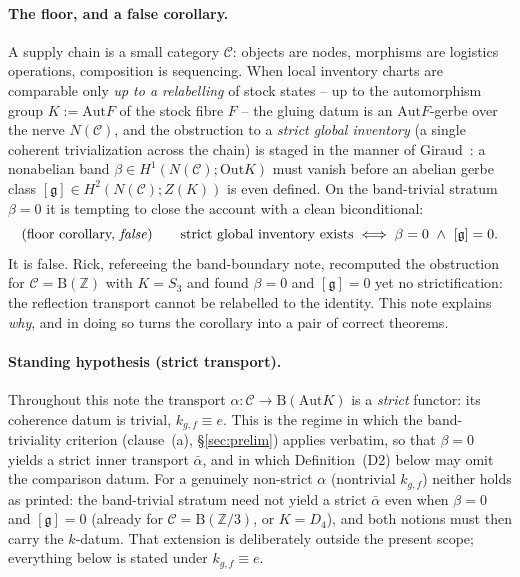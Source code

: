 \documentclass[11pt]{article}
\theoremstyle{definition}
\newcommand{\C}{\mathcal{C}}
\newcommand{\Z}{\mathbb{Z}}
\newcommand{\Aut}{\mathrm{Aut}}
\newcommand{\Out}{\mathrm{Out}}
\newcommand{\gerbe}{\mathfrak{g}}
\newcommand{\abar}{\bar{\alpha}}
\newcommand{\B}{\mathrm{B}}
\begin{document}
\paragraph{The floor, and a false corollary.} A supply chain is a small category $\C$:
objects are nodes, morphisms are logistics operations, composition is sequencing. When
local inventory charts are comparable only \emph{up to a relabelling} of stock states --
up to the automorphism group $K:=\Aut F$ of the stock fibre $F$ -- the gluing datum is an
$\Aut F$-gerbe over the nerve $N(\C)$, and the obstruction to a \emph{strict global
inventory} (a single coherent trivialization across the chain) is staged in the manner of
Giraud~\cite{giraud}: a nonabelian band $\beta\in H^1(N(\C);\Out K)$ must vanish before an
abelian gerbe class $[\gerbe]\in H^2(N(\C);Z(K))$ is even defined. On the band-trivial
stratum $\beta=0$ it is tempting to close the account with a clean biconditional:
\[
\text{(floor corollary, \emph{false})}\qquad
\text{strict global inventory exists}\iff \beta=0\ \wedge\ [\gerbe]=0 .
\]
It is false. Rick, refereeing the band-boundary note, recomputed the obstruction for
$\C=\B(\Z)$ with $K=S_3$ and found $\beta=0$ and $[\gerbe]=0$ yet no strictification: the
reflection transport cannot be relabelled to the identity. This note explains \emph{why},
and in doing so turns the corollary into a pair of correct theorems.

\paragraph{Standing hypothesis (strict transport).} Throughout this note the transport
$\alpha\colon\C\to\B(\Aut K)$ is a \emph{strict} functor: its coherence datum is trivial,
$k_{g,f}\equiv e$. This is the regime in which the band-triviality criterion
(clause~(a), \S\ref{sec:prelim}) applies verbatim, so that $\beta=0$ yields a strict inner
transport $\abar$, and in which Definition~(D2) below may omit the comparison datum. For a
genuinely non-strict $\alpha$ (nontrivial $k_{g,f}$) neither holds as printed: the
band-trivial stratum need not yield a strict $\abar$ even when $\beta=0$ and $[\gerbe]=0$
(already for $\C=\B(\Z/3)$, or $K=D_4$), and both notions must then carry the $k$-datum.
That extension is deliberately outside the present scope; everything below is stated under
$k_{g,f}\equiv e$.
\end{document}
